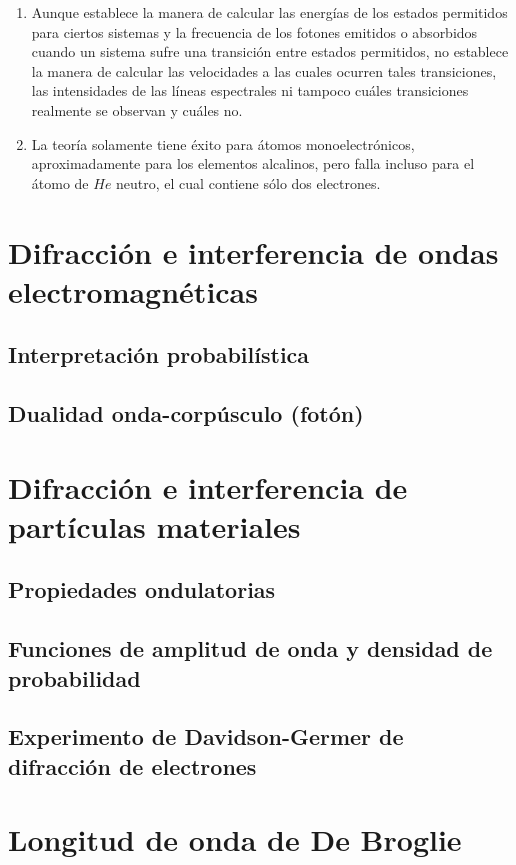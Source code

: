 \documentclass[oneside]{book}
\numberwithin{equation}{section}
\numberwithin{figure}{section}
\numberwithin{table}{section}
\begin{document}
				\begin{enumerate}
					\item Aunque establece la manera de calcular las energías de los estados permitidos para ciertos sistemas y la frecuencia de los fotones emitidos o absorbidos cuando un sistema sufre una transición entre estados permitidos, no establece la manera de calcular las velocidades a las cuales ocurren tales transiciones, las intensidades de las líneas espectrales ni tampoco cuáles transiciones realmente se observan y cuáles no.
					\item La teoría solamente tiene éxito para átomos monoelectrónicos, aproximadamente para los elementos alcalinos, pero falla incluso para el átomo de $He$ neutro, el cual contiene sólo dos electrones.
				\end{enumerate}							
			
		\section{Difracción e interferencia de ondas electromagnéticas}
			\subsection{Interpretación probabilística}
			\subsection{Dualidad onda-corpúsculo (fotón)}
		\section{Difracción e interferencia de partículas materiales}
			\subsection{Propiedades ondulatorias}
			\subsection{Funciones de amplitud de onda y densidad de probabilidad}
			\subsection{Experimento de Davidson-Germer de difracción de electrones} 
		\section{Longitud de onda de De Broglie}
			
\end{document}
